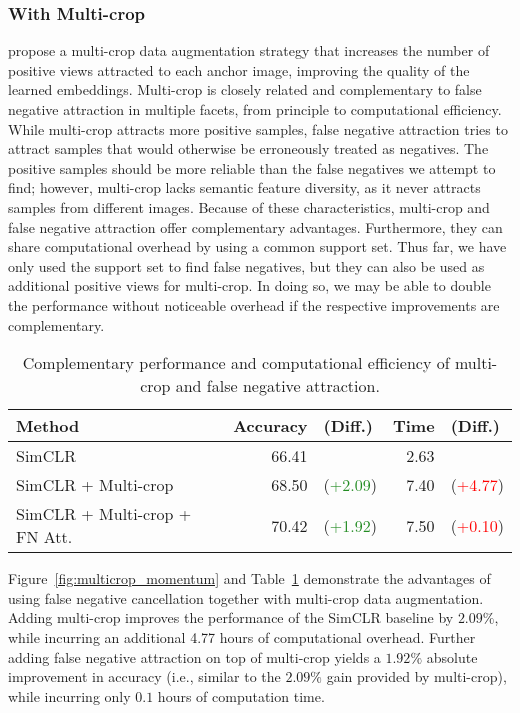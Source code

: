 \documentclass[10pt,twocolumn,letterpaper]{article}
\begin{document}
\vspace{-5pt}
\subsubsection{With Multi-crop}

\citet{caron2020unsupervised} propose a multi-crop data augmentation strategy that increases the number of positive views attracted to each anchor image, improving the quality of the learned embeddings. Multi-crop is closely related and complementary to false negative attraction in multiple facets, from principle to computational efficiency. While multi-crop attracts more positive samples, false negative attraction tries to attract samples that would otherwise be erroneously treated as negatives. The positive samples should be more reliable than the false negatives we attempt to find; however, multi-crop lacks semantic feature diversity, as it never attracts samples from different images. Because of these characteristics, multi-crop and false negative attraction offer complementary advantages. Furthermore, they can share computational overhead by using a common support set. Thus far, we have only used the support set to find false negatives, but they can also be used as additional positive views for multi-crop. In doing so, we may be able to double the performance without noticeable overhead if the respective improvements are complementary.

\begin{table}[!t]
    \centering
    {\footnotesize
    \begin{tabularx}{\linewidth}{Xr@{ }lr@{ }l}
    \toprule
    Method & Accuracy & (Diff.) & Time & (Diff.)\\
    \midrule
    SimCLR & 66.41 & & 2.63 & \\
    SimCLR + Multi-crop &  68.50 & (\textcolor{ForestGreen}{+2.09}) &  7.40 & (\textcolor{red}{+4.77})\\
    SimCLR + Multi-crop + FN Att.\ &  70.42 & (\textcolor{ForestGreen}{+1.92}) & 7.50 & (\textcolor{red}{+0.10})\\
    \bottomrule
    \end{tabularx}}
    \vspace{3pt}
    \caption{Complementary performance and computational efficiency of multi-crop and false negative attraction.} \label{tab:efficiency}
\end{table}
Figure~\ref{fig:multicrop_momentum} and Table~\ref{tab:efficiency} demonstrate the advantages of using false negative cancellation together with multi-crop data augmentation. Adding multi-crop improves the performance of the SimCLR baseline by $2.09\%$, while incurring an additional 4.77 hours of computational overhead. Further adding false negative attraction on top of multi-crop yields a $1.92\%$ absolute improvement in accuracy (i.e., similar to the $2.09\%$ gain provided by multi-crop), while incurring only $0.1$ hours of computation time.
\end{document}
